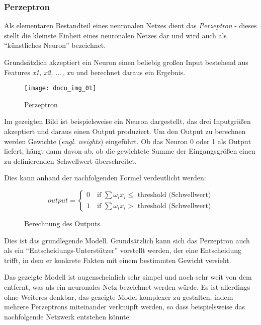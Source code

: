 \subsubsection*{Perzeptron}

Als elementaren Bestandteil eines neuronalen Netzes dient das \textit{Perzeptron} - dieses stellt die kleinste Einheit eines neuronalen Netzes dar und wird auch als ``künstliches Neuron'' bezeichnet.

Grundsätzlich akzeptiert ein Neuron einen beliebig großen Input bestehend aus Features \textit{x1, x2, ..., xn} und berechnet daraus ein Ergebnis.

\begin{figure}[H]
    \centering
    \texttt{[image: docu\_img\_01]}
    \caption{Perzeptron}
    \label{fig:perzeptron}
\end{figure}

Im gezeigten Bild ist beispielsweise ein Neuron dargestellt, das drei Inputgrößen akzeptiert und daraus einen Output produziert. Um den Output zu berechnen werden Gewichte (\textit{engl. weights}) eingeführt. Ob das Neuron 0 oder 1 als Output liefert, hängt dann davon ab, ob die gewichtete Summe der Eingangsgrößen einen zu definierenden Schwellwert überschreitet.

Dies kann anhand der nachfolgenden Formel verdeutlicht werden:

\begin{figure}[H]
    \centering
    \[ output =
      \begin{cases}
        0 \quad \text{if } \sum \omega_i x_i \leqslant \text{ threshold (Schwellwert)}\\
        1 \quad \text{if } \sum \omega_i x_i > \text{ threshold (Schwellwert)}
      \end{cases}
    \]
    \caption{Berechnung des Outputs.}
    \label{fig:neuron-three-way}
\end{figure}

Dies ist das grundlegende Modell. Grundsätzlich kann sich das Perzeptron auch als ein ``Entscheidungs-Unterstützer'' vorstellt werden, der eine Entscheidung trifft, in dem er konkrete Fakten mit einem bestimmten Gewicht versieht.

Das gezeigte Modell ist augenscheinlich sehr simpel und noch sehr weit von dem entfernt, was als ein neuronales Netz bezeichnet werden würde. Es ist allerdings ohne Weiteres denkbar, das gezeigte Model komplexer zu gestalten, indem mehrere Perzeptrons miteinander verknüpft werden, so dass beispielsweise das nachfolgende Netzwerk entstehen könnte:

